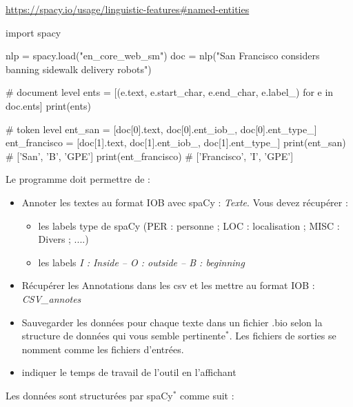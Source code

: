 \url{https://spacy.io/usage/linguistic-features#named-entities}

\vspace{0.5cm}

\begin{python}
import spacy

nlp = spacy.load("en_core_web_sm")
doc = nlp("San Francisco considers banning sidewalk delivery robots")

# document level
ents = [(e.text, e.start_char, e.end_char, e.label_) for e in doc.ents]
print(ents)

# token level
ent_san = [doc[0].text, doc[0].ent_iob_, doc[0].ent_type_]
ent_francisco = [doc[1].text, doc[1].ent_iob_, doc[1].ent_type_]
print(ent_san)  # ['San', 'B', 'GPE']
print(ent_francisco)  # ['Francisco', 'I', 'GPE']
\end{python}

Le programme doit permettre de :

\begin{itemize}
     
    \item Annoter les textes au format IOB avec spaCy : \textit{Texte}. Vous devez récupérer : 
    \begin{itemize}
    	\item les labels type de spaCy (PER : personne ; LOC : localisation ; MISC : Divers ; ....) 
    	\item les labels \textit{I : Inside – O : outside – B : beginning} 
    \end{itemize}
  	\item Récupérer les Annotations dans les csv et les mettre au format IOB : \textit{CSV\_annotes}
    \item Sauvegarder les données pour chaque texte dans un fichier .bio selon la structure de données qui vous semble pertinente$^*$. Les fichiers de sorties se nomment comme les fichiers d'entrées.

	\item indiquer le temps de travail de l'outil en l'affichant
\end{itemize}

Les données sont structurées par spaCy$^*$ comme suit :

 \begin{python}   
 \end{python}




